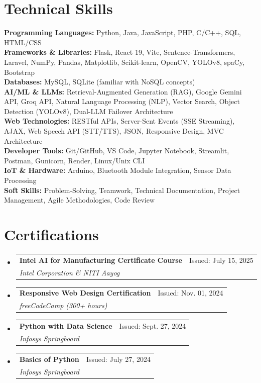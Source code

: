 \documentclass[letterpaper,11pt]{article}
\makeatletter
\newcommand{\resumeSubheading}[4]{
  \vspace{-2pt}\item
    \begin{tabular*}{0.97\textwidth}[t]{l@{\extracolsep{\fill}}r}
      \textbf{#1} & #2 \\
      \textit{\small#3} & \textit{\small #4} \\
    \end{tabular*}\vspace{-7pt}
}
\newcommand{\resumeSubHeadingListStart}{\begin{itemize}[leftmargin=0.15in, label={}]}
\newcommand{\resumeSubHeadingListEnd}{\end{itemize}}
\makeatother
\begin{document}
\section{Technical Skills}
 \begin{itemize}[leftmargin=0.15in, label={}]
    \small{\item{
     \textbf{Programming Languages:} Python, Java, JavaScript, PHP, C/C++, SQL, HTML/CSS \\
     \textbf{Frameworks \& Libraries:} Flask, React 19, Vite, Sentence-Transformers, Laravel, NumPy, Pandas, Matplotlib, Scikit-learn, OpenCV, YOLOv8, spaCy, Bootstrap \\
     \textbf{Databases:} MySQL, SQLite (familiar with NoSQL concepts) \\
     \textbf{AI/ML \& LLMs:} Retrieval-Augmented Generation (RAG), Google Gemini API, Groq API, Natural Language Processing (NLP), Vector Search, Object Detection (YOLOv8), Dual-LLM Failover Architecture \\
     \textbf{Web Technologies:} RESTful APIs, Server-Sent Events (SSE Streaming), AJAX, Web Speech API (STT/TTS), JSON, Responsive Design, MVC Architecture \\
     \textbf{Developer Tools:} Git/GitHub, VS Code, Jupyter Notebook, Streamlit, Postman, Gunicorn, Render, Linux/Unix CLI \\
     \textbf{IoT \& Hardware:} Arduino, Bluetooth Module Integration, Sensor Data Processing \\
     \textbf{Soft Skills:} Problem-Solving, Teamwork, Technical Documentation, Project Management, Agile Methodologies, Code Review
    }}
 \end{itemize}

\section{Certifications}
  \resumeSubHeadingListStart
    \resumeSubheading
      {Intel AI for Manufacturing Certificate Course}{Issued: July 15, 2025}
      {Intel Corporation \& NITI Aayog}{}
    \resumeSubheading
      {Responsive Web Design Certification}{Issued: Nov. 01, 2024}
      {freeCodeCamp (300+ hours)}{}
    \resumeSubheading
      {Python with Data Science}{Issued: Sept. 27, 2024}
      {Infosys Springboard}{}
    \resumeSubheading
      {Basics of Python}{Issued: July 27, 2024}
      {Infosys Springboard}{}
  \resumeSubHeadingListEnd

\end{document}
